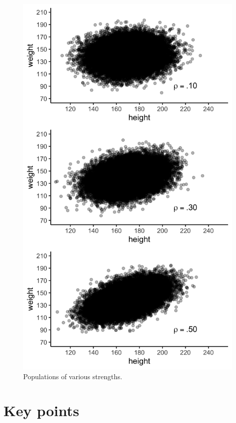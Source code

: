 \documentclass[
]{krantz}
\begin{document}
\begin{figure}
\includegraphics[width=16.67in,height=0.6\textheight]{ch_populations/images/rho_example} \caption{Populations of various strengths.}\label{fig:rhoplot}
\end{figure}

\newpage

\hypertarget{key-points}{%
\section{Key points}\label{key-points}}
\end{document}
